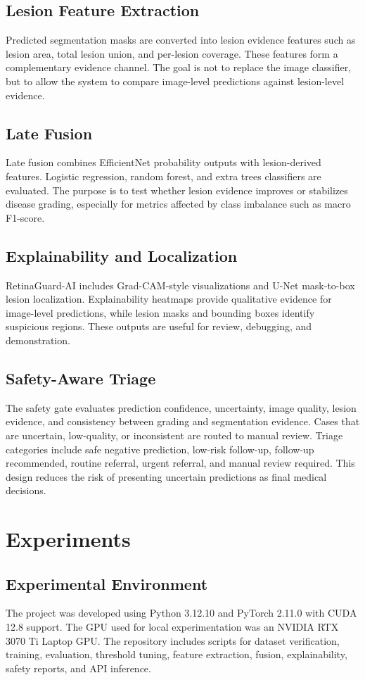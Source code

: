 \documentclass[conference]{IEEEtran}
\begin{document}
\subsection{Lesion Feature Extraction}
Predicted segmentation masks are converted into lesion evidence features such as lesion area, total lesion union, and per-lesion coverage. These features form a complementary evidence channel. The goal is not to replace the image classifier, but to allow the system to compare image-level predictions against lesion-level evidence.

\subsection{Late Fusion}
Late fusion combines EfficientNet probability outputs with lesion-derived features. Logistic regression, random forest, and extra trees classifiers are evaluated. The purpose is to test whether lesion evidence improves or stabilizes disease grading, especially for metrics affected by class imbalance such as macro F1-score.

\subsection{Explainability and Localization}
RetinaGuard-AI includes Grad-CAM-style visualizations and U-Net mask-to-box lesion localization. Explainability heatmaps provide qualitative evidence for image-level predictions, while lesion masks and bounding boxes identify suspicious regions. These outputs are useful for review, debugging, and demonstration.

\subsection{Safety-Aware Triage}
The safety gate evaluates prediction confidence, uncertainty, image quality, lesion evidence, and consistency between grading and segmentation evidence. Cases that are uncertain, low-quality, or inconsistent are routed to manual review. Triage categories include safe negative prediction, low-risk follow-up, follow-up recommended, routine referral, urgent referral, and manual review required. This design reduces the risk of presenting uncertain predictions as final medical decisions.

\section{Experiments}
\subsection{Experimental Environment}
The project was developed using Python 3.12.10 and PyTorch 2.11.0 with CUDA 12.8 support. The GPU used for local experimentation was an NVIDIA RTX 3070 Ti Laptop GPU. The repository includes scripts for dataset verification, training, evaluation, threshold tuning, feature extraction, fusion, explainability, safety reports, and API inference.
\end{document}
